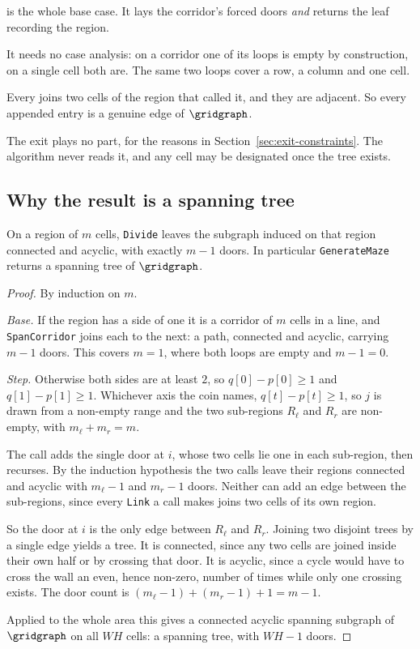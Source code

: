 \Span{} is the whole base case. It lays the corridor's forced doors \emph{and}
returns the leaf recording the region.

It needs no case analysis: on a corridor one of its loops is empty by
construction, on a single cell both are. The same two loops cover a row, a
column and one cell.

Every \Link{} joins two cells of the region that called it, and they are
adjacent. So every appended entry is a genuine edge of $\gridgraph$.

The exit plays no part, for the reasons in
Section~\ref{sec:exit-constraints}. The algorithm never reads it, and any cell
may be designated once the tree exists.

\subsection{Why the result is a spanning tree}

\begin{proposition}
\label{prop:generation-is-a-tree}
On a region of $m$ cells, \textup{\texttt{Divide}} leaves the subgraph induced
on that region connected and acyclic, with exactly $m-1$ doors. In particular
\textup{\texttt{GenerateMaze}} returns a spanning tree of $\gridgraph$.
\end{proposition}

\begin{proof}
By induction on $m$.

\emph{Base.} If the region has a side of one it is a corridor of $m$ cells in a
line, and \texttt{SpanCorridor} joins each to the next: a path, connected and
acyclic, carrying $m-1$ doors. This covers $m=1$, where both loops are empty and
$m-1=0$.

\emph{Step.} Otherwise both sides are at least $2$, so $q[0]-p[0]\ge1$ and
$q[1]-p[1]\ge1$. Whichever axis the coin names, $q[t]-p[t]\ge1$, so $j$ is drawn
from a non-empty range and the two sub-regions $R_\ell$ and $R_r$ are non-empty,
with $m_\ell+m_r=m$.

The call adds the single door at $i$, whose two cells lie one in each
sub-region, then recurses. By the induction hypothesis the two calls leave their
regions connected and acyclic with $m_\ell-1$ and $m_r-1$ doors. Neither can add
an edge between the sub-regions, since every \texttt{Link} a call makes joins
two cells of its own region.

So the door at $i$ is the only edge between $R_\ell$ and $R_r$. Joining two
disjoint trees by a single edge yields a tree. It is connected, since any two
cells are joined inside their own half or by crossing that door. It is acyclic,
since a cycle would have to cross the wall an even, hence non-zero, number of
times while only one crossing exists. The door count is
$(m_\ell-1)+(m_r-1)+1=m-1$.

Applied to the whole area this gives a connected acyclic spanning subgraph of
$\gridgraph$ on all $WH$ cells: a spanning tree, with $WH-1$ doors.
\end{proof}

